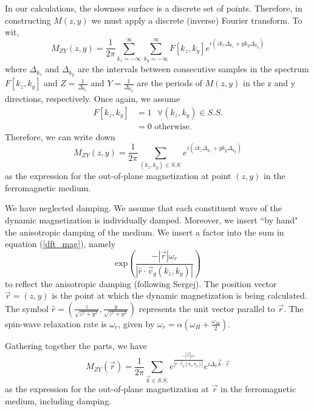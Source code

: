 \documentclass{article}
\begin{document}
In our calculations, the slowness surface is a discrete set of points. Therefore, in constructing $M(z,y)$ we must apply a discrete (inverse) Fourier transform. To wit,
\begin{equation}
M_{Z Y}(z,y) = \frac{1}{2\pi}\sum_{k_{z} = -\infty}^{\infty} \sum_{k_{y} = -\infty}^{\infty} F[k_{z},k_{y}] e^{i (z k_{z} \Delta_{k_{z}} + y k_{y} \Delta_{k_{y}})}
\end{equation}
where $\Delta_{k_{z}}$ and $\Delta_{k_{y}}$ are the intervals between consecutive samples in the spectrum $F[k_{z},k_{y}]$ and $Z = \frac{1}{\Delta_{k_{z}}}$ and $Y = \frac{1}{\Delta_{k_{y}}}$ are the periods of $M(z,y)$ in the z and y directions, respectively. 
Once again, we assume
\begin{align}
F[k_{z},k_{y}] &= 1 \text{  } \forall (k_{z},k_{y}) \in S.S. \\
&= 0 \text{ otherwise.} \nonumber
\end{align}
Therefore, we can write down 
\begin{equation}\label{dft_mag}
M_{Z Y}(z,y) = \frac{1}{2\pi}\sum_{(k_{z},k_{y}) \in S.S.} e^{i (z k_{z} \Delta_{k_{z}} + y k_{y} \Delta_{k_{y}})}
\end{equation}
as the expression for the out-of-plane magnetization at point $(z,y)$ in the ferromagnetic medium.

We have neglected damping.
We assume that each constituent wave of the dynamic magnetization is individually damped. 
Moreover, we insert ``by hand" the anisotropic damping of the medium.
We insert a factor into the sum in equation (\ref{dft_mag}), namely
\begin{equation}
\text{exp}\left(\frac{-|\vec{r}| \omega_{r}}{|\hat{r} \cdot \vec{v}_{g}(k_{z},k_{y}) |}\right)
\end{equation}
to reflect the anisotropic damping (following Sergej). 
The position vector $\vec{r} = (z,y)$ is the point at which the dynamic magnetization is being calculated. 
The symbol $\hat{r} = \left(\frac{z}{\sqrt{z^2+y^2}},\frac{y}{\sqrt{z^2+y^2}}\right)$ represents the unit vector parallel to $\vec{r}$. 
The spin-wave relaxation rate is $\omega_{r}$, given by $\omega_{r} = \alpha (\omega_{H} + \frac{\omega_{M}}{2})$.

Gathering together the parts, we have
\begin{equation}
M_{Z Y}(\vec{r}) = \frac{1}{2\pi}\sum_{\vec{k} \in S.S.} e^{\frac{-|\vec{r}| \omega_{r}}{|\hat{r} \cdot \vec{v}_{g}(k_{z},k_{y}) |}}             e^{i \Delta_{k} \vec{k} \cdot \vec{r}}
\end{equation}
as the expression for the out-of-plane magnetization at $\vec{r}$ in the ferromagnetic medium, including damping.
\end{document}
